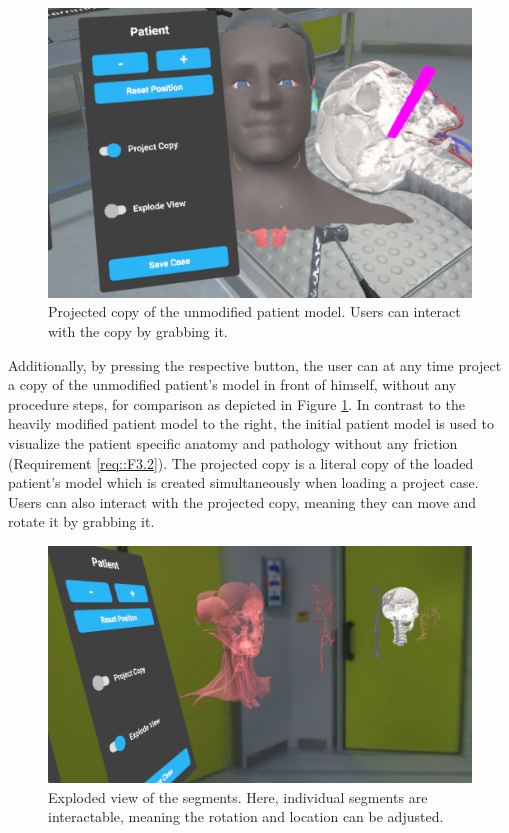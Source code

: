 \begin{figure}[ht]
  \centering
  \includegraphics[width=\linewidth]{images/implementation/features/visualization/project_copy.png}
  \caption{\label{fig::ProjectCopy} Projected copy of the unmodified patient model. Users can interact with the copy by grabbing it.}
\end{figure}

Additionally, by pressing the respective button, the user can at any time project a copy of the unmodified patient's model in front of himself, without any procedure steps, for comparison as 
depicted in Figure \ref{fig::ProjectCopy}.
In contrast to the heavily modified patient model to the right, the initial patient model is used to visualize the patient specific anatomy and pathology without any 
friction (Requirement \ref{req::F3.2}).
The projected copy is a literal copy of the loaded patient's model which is created simultaneously when loading a project case.
Users can also interact with the projected copy, meaning they can move and rotate it by grabbing it.

\begin{figure}[ht]
  \centering
  \includegraphics[width=\linewidth]{images/implementation/features/visualization/explode_view.png}
  \caption{\label{fig::ExplodeView} Exploded view of the segments. Here, individual segments are interactable, meaning the rotation and location can be adjusted.}
\end{figure}

